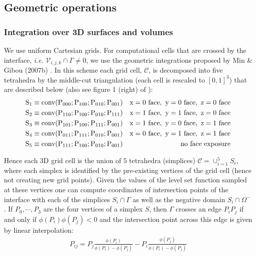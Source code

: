 \documentclass{elsarticle}
\begin{document}
\subsection{Geometric operations}
\subsubsection{Integration over 3D surfaces and volumes}
We use uniform Cartesian grids. For computational cells that are crossed by the interface, \textit{i.e.} $\mathcal{V}_{i,j,k}\cap \Gamma \neq 0$, we use the geometric integrations proposed by Min \& Gibou (2007b) \cite{min2007geometric}. In this scheme each grid cell, $\mathcal{C}$, is decomposed into five tetrahedra by the middle-cut triangulation \cite{sallee1984middle} (each cell is rescaled to $[0,1]^3$) that are described below (also see figure 1 (right) of \cite{min2007geometric}):
\begin{align*}
	 & \rm S_1 \equiv conv(P_{000} ; P_{100} ; P_{010} ; P_{001}) & \rm{ x = 0\ face,\ y = 0\ face,\ z = 0\ face} \\
	 & \rm S_2 \equiv conv(P_{110} ; P_{100} ; P_{010} ; P_{111}) & \rm{ x = 1\ face,\ y = 1\ face,\ z = 0\ face} \\
	 & \rm S_3 \equiv conv(P_{101} ; P_{100} ; P_{111} ; P_{001}) & \rm{ x = 1\ face,\ y = 0\ face,\ z = 1\ face} \\
	 & \rm S_4 \equiv conv(P_{011} ; P_{111} ; P_{010} ; P_{001}) & \rm{ x = 0\ face,\ y = 1\ face,\ z = 1\ face} \\
	 & \rm S_5\equiv conv(P_{111} ; P_{100} ; P_{010} ; P_{001})  & \rm{ no\ face\ exposure}
\end{align*}

Hence each 3D grid cell is the union of $5$ tetrahedra (simplices) $\mathcal{C}=\cup_{i=1}^5 S_i$, where each simplex is identified by the pre-existing vertices of the grid cell (hence not creating new grid points). Given the values of the level set function sampled at these vertices one can compute coordinates of intersection points of the interface with each of the simplices $S_i \cap \Gamma $ as well as the negative domain $S_i \cap \Omega^-$. If ${P_0,\cdots, P_3}$ are the four vertices of a simplex $S$, then $\Gamma$ crosses an edge $P_i P_j$ if and only if $\phi(P_i)\phi(P_j)<0$ and the intersection point across this edge is given by linear interpolation:
\begin{align*}
P_{ij}=P_j \frac{\phi(P_i)}{\phi(P_i) - \phi(P_j)} - P_i \frac{\phi(P_j)}{\phi(P_i) - \phi(P_j)}
\end{align*}
\end{document}
